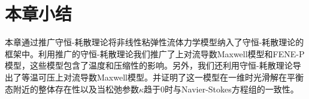 \section{本章小结}
本章通过推广守恒-耗散理论将非线性粘弹性流体力学模型纳入了守恒-耗散理论的框架中。利用推广的守恒-耗散理论我们推广了上对流导数Maxwell模型和FENE-P模型，这些模型包含了温度和压缩性的影响。另外，我们还利用守恒-耗散理论导出了等温可压上对流导数Maxwell模型。并证明了这一模型在一维时光滑解在平衡态附近的整体存在性以及当松弛参数$\kappa$趋于$0$时与Navier-Stokes方程组的一致性。



% 